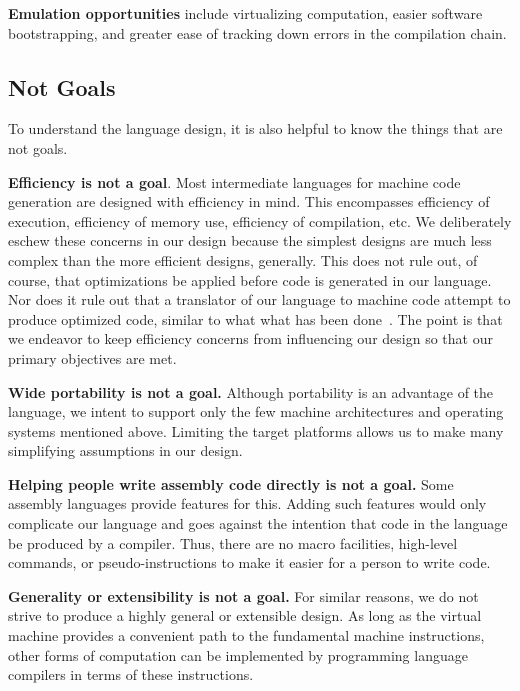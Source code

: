 \textbf{Emulation opportunities} include virtualizing computation,
easier software bootstrapping, and greater ease of tracking down errors
in the compilation chain.

\subsection{Not Goals}

To understand the language design, it is also helpful to know the
things that are not goals.

\textbf{Efficiency is not a goal}.
Most intermediate languages for machine code generation
are designed with efficiency in mind.
This encompasses efficiency of execution, efficiency
of memory use, efficiency of compilation, etc.
We deliberately eschew these concerns
in our design because the simplest designs
are much less complex than the more efficient designs, generally.
This does not rule out, of course, that optimizations be applied before
code is generated in our language. Nor does it rule out that a translator of
our language to machine code attempt to produce optimized
code, similar to what what has been done~\cite{davidson1980design, tanenbaum1982using}.
The point is that we endeavor to keep efficiency concerns from influencing our
design so that our primary objectives are met.

\textbf{Wide portability is not a goal.}
Although portability is an advantage of the language, we intent
to support only the few machine architectures and operating systems
mentioned above. Limiting the target platforms allows us to make
many simplifying assumptions in our design.

\textbf{Helping people write assembly code directly is not a goal.}
Some assembly languages provide features for this.
Adding such features would only complicate our language
and goes against the intention that code in the language be
produced by a compiler. Thus, there are no macro facilities, high-level commands,
or pseudo-instructions to make it easier for a person to write code.

\textbf{Generality or extensibility is not a goal.}
For similar reasons, we do not strive to produce a highly general
or extensible design. As long as the virtual machine provides
a convenient path to the fundamental machine instructions, other forms of
computation can be implemented by programming language compilers in
terms of these instructions.
